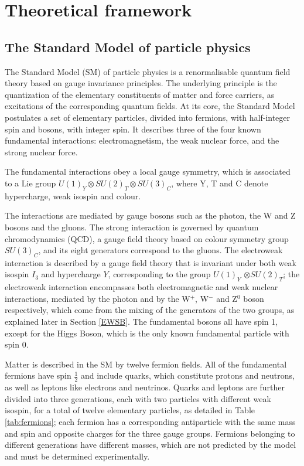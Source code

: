 \chapter{Theoretical framework}
\section{The Standard Model of particle physics}
The Standard Model (SM) of particle physics is a renormalisable quantum field theory based on gauge invariance principles.
The underlying principle is the quantization of the elementary constituents of matter and force carriers,
as excitations of the corresponding quantum fields.
At its core, the Standard Model postulates a set of elementary particles, divided into fermions, with half-integer spin and bosons, with integer spin.
It describes three of the four known fundamental interactions: electromagnetism, the weak nuclear force, and the strong nuclear force.

The fundamental interactions obey a local gauge symmetry, which is associated to a Lie group $U(1)_Y \otimes SU(2)_T \otimes SU(3)_C$, where Y, T and C denote hypercharge, weak isospin and colour.

The interactions are mediated by gauge bosons such as the photon, the W and Z bosons and the gluons.
The strong interaction is governed by quantum chromodynamics (QCD), a gauge field theory based on colour symmetry group $SU(3)_C$,
and its eight generators correspond to the gluons.
The electroweak interaction is described by a gauge field theory that is invariant under both weak isospin $I_3$ and hypercharge $Y$,
corresponding to the group $U(1)_Y$ $\otimes SU(2)_T$;
the electroweak interaction encompasses both electromagnetic and weak nuclear interactions,
mediated by the photon and by the W$^+$, W$^-$ and Z$^0$ boson respectively,
which come from the mixing of the generators of the two groups, as explained later in Section \ref{EWSB}.
The fundamental bosons all have spin 1, except for the Higgs Boson, which is the only known fundamental particle with spin 0.

Matter is described in the SM by twelve fermion fields.
All of the fundamental fermions have spin $\frac{1}{2}$ and include quarks, which constitute protons and neutrons, as well as leptons like electrons and neutrinos.
Quarks and leptons are further divided into three generations, each with two particles with different weak isospin, for a total of twelve elementary particles, as detailed in Table \ref{tab:fermions}; each fermion has a corresponding antiparticle with the same mass and spin and opposite charges for the three gauge groups.
Fermions belonging to different generations have different masses, which are not predicted by the model and must be determined experimentally.

